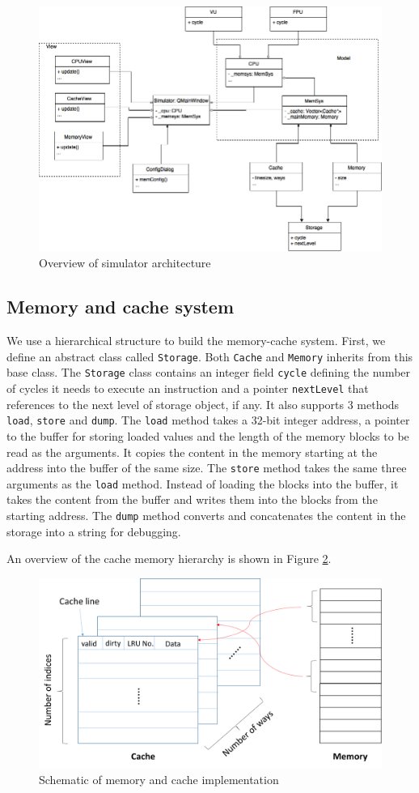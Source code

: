 \documentclass{sig-alternate}
\begin{document}
\begin{figure}
\centering
\includegraphics[width = 0.8\linewidth,keepaspectratio]{uml_simulator}
\caption{Overview of simulator architecture}
\label{fig:uml}
\end{figure}

\subsection{Memory and cache system}
We use a hierarchical structure to build the memory-cache system. First, we define an abstract class called \texttt{Storage}. Both \texttt{Cache} and \texttt{Memory} inherits from this base class. The \texttt{Storage} class contains an integer field \texttt{cycle} defining the number of cycles it needs to execute an instruction and a pointer \texttt{nextLevel} that references to the next level of storage object, if any. It also supports 3 methods \texttt{load}, \texttt{store} and \texttt{dump}. The \texttt{load} method takes a 32-bit integer address, a pointer to the buffer for storing loaded values and the length of the memory blocks to be read as the arguments. It copies the content in the memory starting at the address into the buffer of the same size. The \texttt{store} method takes the same three arguments as the \texttt{load} method. Instead of loading the blocks into the buffer, it takes the content from the buffer and writes them into the blocks from the starting address. The \texttt{dump} method converts and concatenates the content in the storage into a string for debugging. 

An overview of the cache memory hierarchy is shown in Figure \ref{fig:cache_vs_memory}. 
\begin{figure}
\centering
\includegraphics[width = 0.8\linewidth,keepaspectratio]{Cache_and_Memory.png}
\caption{Schematic of memory and cache implementation}
\label{fig:cache_vs_memory}
\end{figure}
\end{document}
